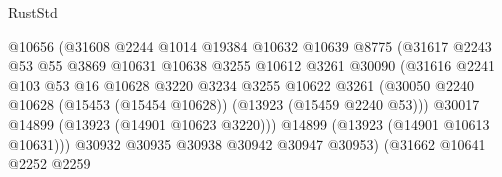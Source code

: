 \begin{lexlean}{RustStd}
\begin{coremodule}
                                        @10656
                                        (@31608
                                          @2244
                                          @1014
                                          @19384
                                          @10632
                                          @10639
                                          @8775
                                          (@31617
                                            @2243
                                            @53
                                            @55
                                            @3869
                                            @10631
                                            @10638
                                            @3255
                                            @10612
                                            @3261
                                            @30090
                                            (@31616
                                              @2241
                                              @103
                                              @53
                                              @16
                                              @10628
                                              @3220
                                              @3234
                                              @3255
                                              @10622
                                              @3261
                                              (@30050
                                                @2240
                                                @10628
                                                (@15453 (@15454 @10628))
                                                (@13923 (@15459 @2240 @53)))
                                              @30017
                                              @14899
                                              (@13923 (@14901 @10623 @3220)))
                                            @14899
                                            (@13923 (@14901 @10613 @10631)))
                                          @30932
                                          @30935
                                          @30938
                                          @30942
                                          @30947
                                          @30953)
                                        (@31662
                                          @10641
                                          @2252
                                          @2259

\end{coremodule}
\end{lexlean}
